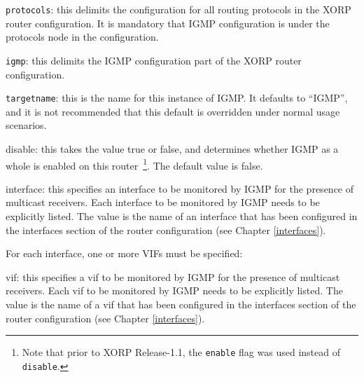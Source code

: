 \begin{description}
\item{\tt protocols}: this delimits the configuration for all routing
  protocols in the XORP router configuration.  It is mandatory that
  IGMP configuration is under the {\stt protocols} node in the
  configuration.
\item{\tt igmp}: this delimits the IGMP configuration part of the XORP
  router configuration.
\item{\tt targetname}: this is the name for this instance of IGMP.  It
  defaults to ``{\stt IGMP}'', and it is not recommended that this
  default is overridden under normal usage scenarios.
\item{\stt disable}: this takes the value {\stt true} or {\stt false},
  and determines whether IGMP as a whole is enabled on this
  router~\footnote{Note
  that prior to XORP Release-1.1, the {\tt enable} flag was used instead of
  {\tt disable}.}.
  The default value is {\stt false}.
\item{\stt interface}: this specifies an interface to be monitored by
  IGMP for the presence of multicast receivers.  Each interface to be
  monitored by IGMP needs to be explicitly listed. The value is the
  name of an interface that has been configured in the {\stt
  interfaces} section of the router configuration (see Chapter
  \ref{interfaces}).

  For each interface, one or more VIFs must be specified:
\begin{description}
\item{\stt vif}: this specifies a vif to be monitored by IGMP for the
  presence of multicast receivers.  Each vif to be monitored by IGMP
  needs to be explicitly listed.  The value is the name of a vif that
  has been configured in the {\stt interfaces} section of the router
  configuration (see Chapter \ref{interfaces}).
 

\end{description}
\end{description}
